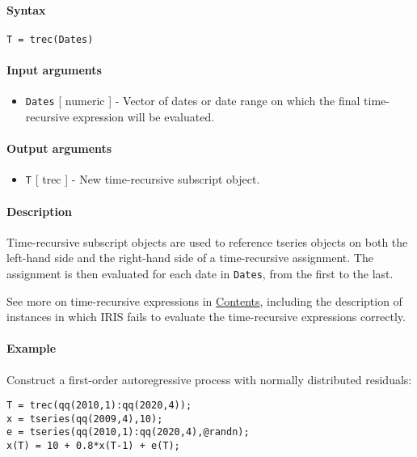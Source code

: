 


	\paragraph{Syntax}

\begin{verbatim}
T = trec(Dates)
\end{verbatim}

\paragraph{Input arguments}

\begin{itemize}
\itemsep1pt\parskip0pt
\item
  \texttt{Dates} {[} numeric {]} - Vector of dates or date range on
  which the final time-recursive expression will be evaluated.
\end{itemize}

\paragraph{Output arguments}

\begin{itemize}
\itemsep1pt\parskip0pt
\item
  \texttt{T} {[} trec {]} - New time-recursive subscript object.
\end{itemize}

\paragraph{Description}

Time-recursive subscript objects are used to reference tseries objects
on both the left-hand side and the right-hand side of a time-recursive
assignment. The assignment is then evaluated for each date in
\texttt{Dates}, from the first to the last.

See more on time-recursive expressions in
\href{trec/Contents}{Contents}, including the description of instances
in which IRIS fails to evaluate the time-recursive expressions
correctly.

\paragraph{Example}

Construct a first-order autoregressive process with normally distributed
residuals:

\begin{verbatim}
T = trec(qq(2010,1):qq(2020,4));
x = tseries(qq(2009,4),10);
e = tseries(qq(2010,1):qq(2020,4),@randn);
x(T) = 10 + 0.8*x(T-1) + e(T);
\end{verbatim}


